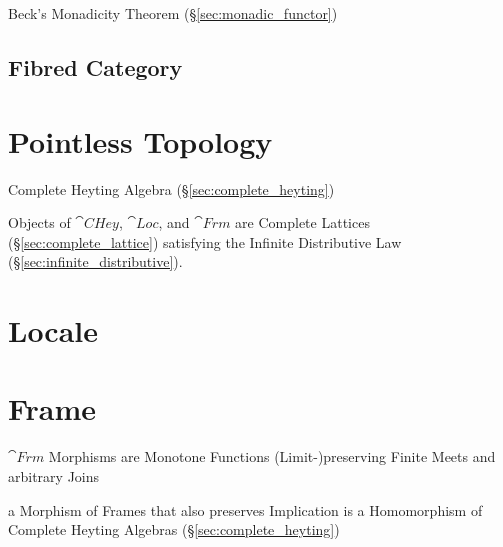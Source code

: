 Beck's Monadicity Theorem (\S\ref{sec:monadic_functor})



\subsection{Fibred Category}\label{sec:fibred_category}



\section{Pointless Topology}\label{sec:pointless_topology}

Complete Heyting Algebra (\S\ref{sec:complete_heyting})

Objects of $\cat{CHey}$, $\cat{Loc}$, and $\cat{Frm}$ are Complete
Lattices (\S\ref{sec:complete_lattice}) satisfying the Infinite
Distributive Law (\S\ref{sec:infinite_distributive}).



\section{Locale}\label{sec:locale}

\section{Frame}\label{sec:frame}

$\cat{Frm}$ Morphisms are Monotone Functions (Limit-)preserving Finite
Meets and arbitrary Joins

a Morphism of Frames that also preserves Implication is a Homomorphism
of Complete Heyting Algebras (\S\ref{sec:complete_heyting})
